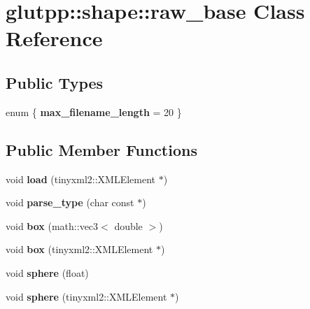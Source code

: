 \hypertarget{classglutpp_1_1shape_1_1raw__base}{\section{glutpp\-:\-:shape\-:\-:raw\-\_\-base \-Class \-Reference}
\label{classglutpp_1_1shape_1_1raw__base}
}
\subsection*{\-Public \-Types}
\begin{DoxyCompactItemize}
\item 
enum \{ {\bfseries max\-\_\-filename\-\_\-length} =  20
 \}
\end{DoxyCompactItemize}
\subsection*{\-Public \-Member \-Functions}
\begin{DoxyCompactItemize}
\item 
\hypertarget{classglutpp_1_1shape_1_1raw__base_a464d9f711f05ecf190d66ca6545f25c1}{void {\bfseries load} (tinyxml2\-::\-X\-M\-L\-Element $\ast$)}\label{classglutpp_1_1shape_1_1raw__base_a464d9f711f05ecf190d66ca6545f25c1}

\item 
\hypertarget{classglutpp_1_1shape_1_1raw__base_a5604ae2a99ec737d4efea9e2dfbca27a}{void {\bfseries parse\-\_\-type} (char const $\ast$)}\label{classglutpp_1_1shape_1_1raw__base_a5604ae2a99ec737d4efea9e2dfbca27a}

\item 
\hypertarget{classglutpp_1_1shape_1_1raw__base_ad614f921966cb126a237423208cf83e6}{void {\bfseries box} (math\-::vec3$<$ double $>$)}\label{classglutpp_1_1shape_1_1raw__base_ad614f921966cb126a237423208cf83e6}

\item 
\hypertarget{classglutpp_1_1shape_1_1raw__base_a3278836cbf86a0a43326d4a6c55cfcc0}{void {\bfseries box} (tinyxml2\-::\-X\-M\-L\-Element $\ast$)}\label{classglutpp_1_1shape_1_1raw__base_a3278836cbf86a0a43326d4a6c55cfcc0}

\item 
\hypertarget{classglutpp_1_1shape_1_1raw__base_a512428080ce2e4489413cd73ff301dc0}{void {\bfseries sphere} (float)}\label{classglutpp_1_1shape_1_1raw__base_a512428080ce2e4489413cd73ff301dc0}

\item 
\hypertarget{classglutpp_1_1shape_1_1raw__base_a43deacb75120d590f294a0b7689c79d4}{void {\bfseries sphere} (tinyxml2\-::\-X\-M\-L\-Element $\ast$)}\label{classglutpp_1_1shape_1_1raw__base_a43deacb75120d590f294a0b7689c79d4}

\end{DoxyCompactItemize}
